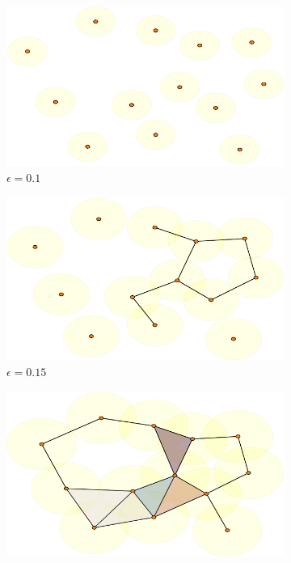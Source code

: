 \documentclass[10pt]{beamer}
\begin{document}
\begin{frame}[fragile]{}
\begin{figure}
  \centering
  \begin{subfigure}[t]{.5\linewidth}
    \includegraphics[scale=.4]{rips_eps=01.pdf}
    \caption{$\epsilon=0.1$}
 \end{subfigure}%
  \begin{subfigure}[t]{.5\linewidth}
    \includegraphics[scale=.4]{rips_eps=015.pdf}
    \caption{$\epsilon=0.15$}
 \end{subfigure}
  \begin{subfigure}[b]{.49\linewidth}
    \includegraphics[scale=.4]{rips_eps=02.pdf}

\end{subfigure}
\end{figure}
\end{frame}
\end{document}
